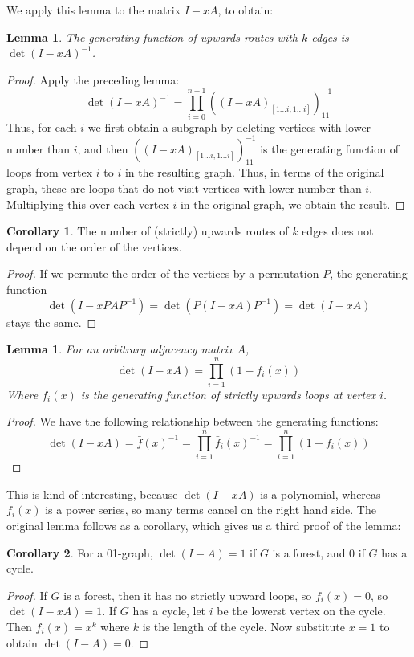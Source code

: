 \documentclass[a4paper, 11pt]{article}
\newtheorem{lemma}[theorem]{Lemma}
\theoremstyle{definition}
\newtheorem{corollary}{Corollary}[theorem]
\begin{document}
We apply this lemma to the matrix $I - xA$, to obtain:

\begin{lemma}
  The generating function of upwards routes with $k$ edges is $\det(I - xA)^{-1}$.
\end{lemma}
\begin{proof}
  Apply the preceding lemma:
  \[ \det(I - xA)^{-1} = \prod_{i=0}^{n-1} ((I - xA)_{[1\dots i, 1\dots i]})^{-1}_{11} \]
  Thus, for each $i$ we first obtain a subgraph by deleting vertices with lower number than $i$, and then $((I - xA)_{[1\dots i, 1\dots i]})^{-1}_{11}$ is the generating function of loops from vertex $i$ to $i$ in the resulting graph. Thus, in terms of the original graph, these are loops that do not visit vertices with lower number than $i$. Multiplying this over each vertex $i$ in the original graph, we obtain the result.
\end{proof}

\begin{corollary}
  The number of (strictly) upwards routes of $k$ edges does not depend on the order of the vertices.
\end{corollary}
\begin{proof}
  If we permute the order of the vertices by a permutation $P$, the generating function
  \[
    \det(I - xPAP^{-1}) = \det(P(I - xA)P^{-1}) = \det(I - xA)
  \] stays the same.
\end{proof}

\begin{lemma} For an arbitrary adjacency matrix $A$,
  \[ \det(I - xA) = \prod_{i = 1}^n (1 - f_i(x)) \]
  Where $f_i(x)$ is the generating function of strictly upwards loops at vertex $i$.
\end{lemma}
\begin{proof}
  We have the following relationship between the generating functions:
  \[
    \det(I - xA) = \bar{f}(x)^{-1} = \prod_{i=1}^n \bar{f}_i(x)^{-1} = \prod_{i=1}^n (1 - f_i(x))
  \]
\end{proof}

This is kind of interesting, because $\det(I - xA)$ is a polynomial, whereas $f_i(x)$ is a power series, so many terms cancel on the right hand side. The original lemma follows as a corollary, which gives us a third proof of the lemma:

\begin{corollary}
  For a 01-graph, $\det(I-A)=1$ if $G$ is a forest, and $0$ if $G$ has a cycle.
\end{corollary}
\begin{proof}
  If $G$ is a forest, then it has no strictly upward loops, so $f_i(x) = 0$, so $\det(I - xA) = 1$. If $G$ has a cycle, let $i$ be the lowerst vertex on the cycle. Then $f_i(x) = x^k$ where $k$ is the length of the cycle. Now substitute $x = 1$ to obtain $\det(I - A) = 0$.
\end{proof}
\end{document}
